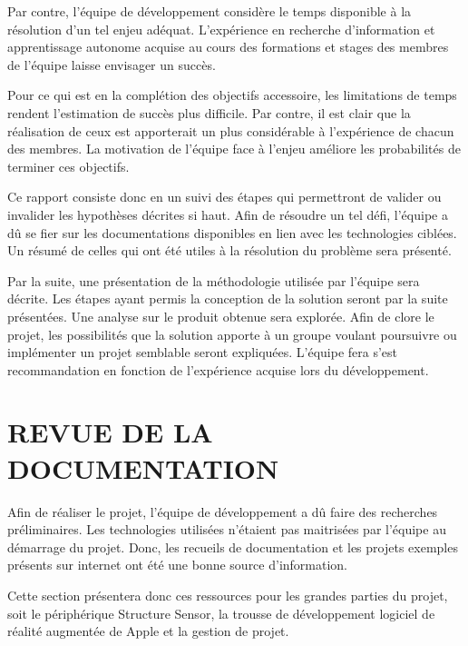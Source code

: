 \documentclass[letterpaper,twoside,12pt,french]{report}
\begin{document}
Par contre, l'équipe de développement considère le temps disponible à la résolution d'un tel enjeu
adéquat. L'expérience en recherche d'information et apprentissage autonome acquise au cours des
formations et stages des membres de l'équipe laisse envisager un succès.
\par
Pour ce qui est en la complétion des objectifs accessoire, les limitations de temps rendent
l'estimation de succès plus difficile. Par contre, il est clair que la réalisation de ceux est
apporterait un plus considérable à l'expérience de chacun des membres. La motivation de l'équipe
face à l'enjeu améliore les probabilités de terminer ces objectifs.
\par
Ce rapport consiste donc en un suivi des étapes qui permettront de valider ou invalider les
hypothèses décrites si haut. Afin de résoudre un tel défi, l'équipe a dû se fier sur les
documentations disponibles en lien avec les technologies ciblées. Un résumé de celles qui ont été
utiles à la résolution du problème sera présenté.
\par
Par la suite, une présentation de la méthodologie utilisée par l'équipe sera décrite. Les étapes
ayant permis la conception de la solution seront par la suite présentées. Une analyse sur le produit
obtenue sera explorée. Afin de clore le projet, les possibilités que la solution apporte à un groupe voulant poursuivre ou
implémenter un projet semblable seront expliquées. L'équipe fera s'est recommandation en fonction
de l'expérience acquise lors du développement.
\chapter*{\uppercase{Revue de la documentation}}
Afin de réaliser le projet, l'équipe de développement a dû faire des recherches préliminaires. Les
technologies utilisées n'étaient pas maitrisées par l'équipe au démarrage du projet. Donc, les
recueils de documentation et les projets exemples présents sur internet ont été une bonne source
d'information.
\par
Cette section présentera donc ces ressources pour les grandes parties du projet,
soit le périphérique Structure Sensor, la trousse de développement logiciel de réalité augmentée de
Apple et la gestion de projet.
\end{document}
